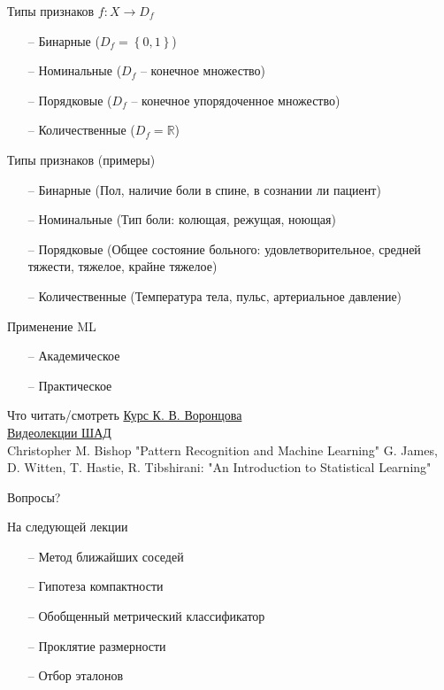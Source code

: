 \documentclass[10pt]{beamer}
\begin{document}
\begin{frame}{Типы признаков}
	${f: X \rightarrow D_f}$
	\begin{itemize} [<+->]
	  \item[--] Бинарные (${D_f = \left\{ 0, 1 \right\} }$)
	  \item[--] Номинальные (${D_f}$ -- конечное множество)
	  \item[--] Порядковые (${D_f}$ -- конечное упорядоченное множество)
	  \item[--] Количественные (${D_f = \mathbb{R} }$)
	\end{itemize}
\end{frame}

\begin{frame}{Типы признаков (примеры)}
	\begin{itemize} [<+->]
	  \item[--] Бинарные (Пол, наличие боли в спине, в сознании ли пациент)
	  \item[--] Номинальные (Тип боли: колющая, режущая, ноющая)
	  \item[--] Порядковые (Общее состояние больного: удовлетворительное, средней тяжести, тяжелое, крайне тяжелое)
	  \item[--] Количественные (Температура тела, пульс, артериальное давление)
	\end{itemize}
\end{frame}

\begin{frame}{Применение ML}
	\begin{itemize} [<+->]
	  \item[--] Академическое
	  \item[--] Практическое
	\end{itemize}
\end{frame}

\begin{frame}{Что читать/смотреть}
  \href{http://www.machinelearning.ru/wiki/images/6/6d/Voron-ML-1.pdf}{Курс К. В. Воронцова}\\
	\href{https://yandexdataschool.ru/edu-process/courses/machine-learning}{Видеолекции ШАД}\\
	Christopher M. Bishop "Pattern Recognition and Machine Learning"
	G. James, D. Witten, T. Hastie, R. Tibshirani: "An Introduction to Statistical Learning" 	
\end{frame}

\begin{frame}[standout]
  Вопросы?
\end{frame}

\appendix

\begin{frame}{На следующей лекции}
	\begin{itemize}
	  \item[--] Метод ближайших соседей
	  \item[--] Гипотеза компактности
	  \item[--] Обобщенный метрический классификатор
	  \item[--] Проклятие размерности  
	  \item[--] Отбор эталонов     
	\end{itemize}
\end{frame}
\end{document}
